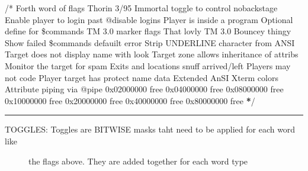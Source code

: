 \documentclass[letterpaper,10pt,english]{sphinxmanual}
\begin{document}
\sphinxAtStartPar
/* Forth word of flags \sphinxhyphen{} Thorin 3/95  Immortal toggle to control no\sphinxhyphen{}backstage  Enable player to login past @disable logins  Player is inside a program  Optional define for \$commands  TM 3.0 marker flags  That lovly TM 3.0 Bouncey thingy  Show failed \$commands defauilt error  Strip UNDERLINE character from ANSI  Target does not display name with look  Target zone allows inheritance of attribs  Monitor the target for spam  Exits and locations snuff arrived/left  Players may not code  Player target has protect name data  Extended AnSI Xterm colors  Attribute piping via @pipe \sphinxstyleemphasis{/
/} 0x02000000 free \sphinxstyleemphasis{/
/} 0x04000000 free \sphinxstyleemphasis{/
/} 0x08000000 free \sphinxstyleemphasis{/
/} 0x10000000 free \sphinxstyleemphasis{/
/} 0x20000000 free \sphinxstyleemphasis{/
/} 0x40000000 free \sphinxstyleemphasis{/
/} 0x80000000 free {\color{red}\bfseries{}*}/


\bigskip\hrule\bigskip

\begin{description}
\item[{TOGGLES: Toggles are BITWISE masks taht need to be applied for each word like}] \leavevmode
\sphinxAtStartPar
the flags above.  They are added together for each word type

\end{description}
\end{document}
